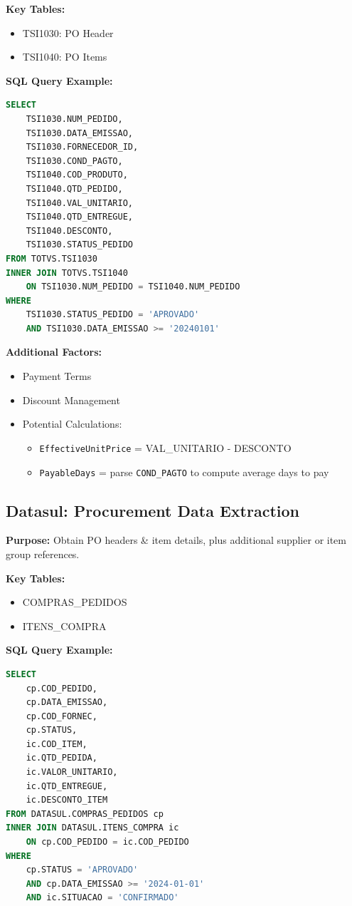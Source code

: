 \documentclass[a4paper,10pt]{article}
\begin{document}
\textbf{Key Tables:}
\begin{itemize}[leftmargin=2em]
    \item TSI1030: PO Header
    \item TSI1040: PO Items
\end{itemize}

\textbf{SQL Query Example:}
\begin{lstlisting}[language=SQL]
SELECT
    TSI1030.NUM_PEDIDO,
    TSI1030.DATA_EMISSAO,
    TSI1030.FORNECEDOR_ID,
    TSI1030.COND_PAGTO,
    TSI1040.COD_PRODUTO,
    TSI1040.QTD_PEDIDO,
    TSI1040.VAL_UNITARIO,
    TSI1040.QTD_ENTREGUE,
    TSI1040.DESCONTO,
    TSI1030.STATUS_PEDIDO
FROM TOTVS.TSI1030
INNER JOIN TOTVS.TSI1040
    ON TSI1030.NUM_PEDIDO = TSI1040.NUM_PEDIDO
WHERE
    TSI1030.STATUS_PEDIDO = 'APROVADO'
    AND TSI1030.DATA_EMISSAO >= '20240101'
\end{lstlisting}

\textbf{Additional Factors:}
\begin{itemize}[leftmargin=2em]
    \item Payment Terms
    \item Discount Management
    \item Potential Calculations:
    \begin{itemize}[leftmargin=1.5em]
        \item \texttt{EffectiveUnitPrice} = VAL\_UNITARIO - DESCONTO
        \item \texttt{PayableDays} = parse \texttt{COND\_PAGTO} to compute average days to pay
    \end{itemize}
\end{itemize}

\subsection{Datasul: Procurement Data Extraction}
\textbf{Purpose:} Obtain PO headers \& item details, plus additional supplier or item group references.

\textbf{Key Tables:}
\begin{itemize}[leftmargin=2em]
    \item COMPRAS\_PEDIDOS
    \item ITENS\_COMPRA
\end{itemize}

\textbf{SQL Query Example:}
\begin{lstlisting}[language=SQL]
SELECT
    cp.COD_PEDIDO,
    cp.DATA_EMISSAO,
    cp.COD_FORNEC,
    cp.STATUS,
    ic.COD_ITEM,
    ic.QTD_PEDIDA,
    ic.VALOR_UNITARIO,
    ic.QTD_ENTREGUE,
    ic.DESCONTO_ITEM
FROM DATASUL.COMPRAS_PEDIDOS cp
INNER JOIN DATASUL.ITENS_COMPRA ic
    ON cp.COD_PEDIDO = ic.COD_PEDIDO
WHERE
    cp.STATUS = 'APROVADO'
    AND cp.DATA_EMISSAO >= '2024-01-01'
    AND ic.SITUACAO = 'CONFIRMADO'
\end{lstlisting}
\end{document}
